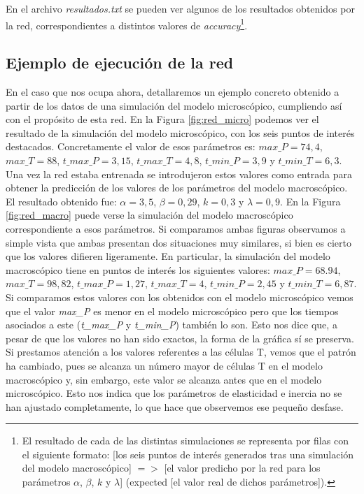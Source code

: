 En el archivo \textit{resultados.txt} se pueden ver algunos de los resultados obtenidos por la red, correspondientes a distintos valores de \textit{accuracy}\footnote{El resultado de cada de las distintas simulaciones se representa por filas con el siguiente formato: [los seis puntos de interés generados tras una simulación del modelo macroscópico] $=>$ [el valor predicho por la red para los parámetros $\alpha$, $\beta$, $k$ y $\lambda$] (expected [el valor real de dichos parámetros]).}. 


\subsection{Ejemplo de ejecución de la red}

En el caso que nos ocupa ahora, detallaremos un ejemplo concreto obtenido a partir de los datos de una simulación del modelo microscópico, cumpliendo así con el propósito de esta red. En la Figura \ref{fig:red_micro} podemos ver el resultado de la simulación del modelo microscópico, con los seis puntos de interés destacados. Concretamente el valor de esos parámetros es: $\textit{max\_P} = 74,4$, $\textit{max\_T} = 88$, $\textit{t\_max\_P} = 3,15$, $\textit{t\_max\_T} = 4,8$, $\textit{t\_min\_P} = 3,9$ y $\textit{t\_min\_T} = 6,3$. Una vez la red estaba entrenada se introdujeron estos valores como entrada para obtener la predicción de los valores de los parámetros del modelo macroscópico. El resultado obtenido fue: $\alpha = 3,5$, $\beta = 0,29$, $k = 0,3$ y $\lambda = 0,9$. En la Figura \ref{fig:red_macro} puede verse la simulación del modelo macroscópico correspondiente a esos parámetros. Si comparamos ambas figuras observamos a simple vista que ambas presentan dos situaciones muy similares, si bien es cierto que los valores difieren ligeramente. En particular, la simulación del modelo macroscópico tiene en puntos de interés los siguientes valores: $\textit{max\_P} = 68.94$, $\textit{max\_T} = 98,82$, $\textit{t\_max\_P} = 1,27$, $\textit{t\_max\_T} =4$, $\textit{t\_min\_P} = 2,45$ y $\textit{t\_min\_T} = 6,87$. Si comparamos estos valores con los obtenidos con el modelo microscópico vemos que el valor \textit{max\_P} es menor en el modelo microscópico pero que los tiempos asociados a este (\textit{t\_max\_P} y \textit{t\_min\_P}) también lo son. Esto nos dice que, a pesar de que los valores no han sido exactos, la forma de la gráfica sí se preserva. Si prestamos atención a los valores referentes a las células T, vemos que el patrón ha cambiado, pues se alcanza un número mayor de células T en el modelo macroscópico y, sin embargo, este valor se alcanza antes que en el modelo microscópico. Esto nos indica que los parámetros de elasticidad e inercia no se han ajustado completamente, lo que hace que observemos ese pequeño desfase.



